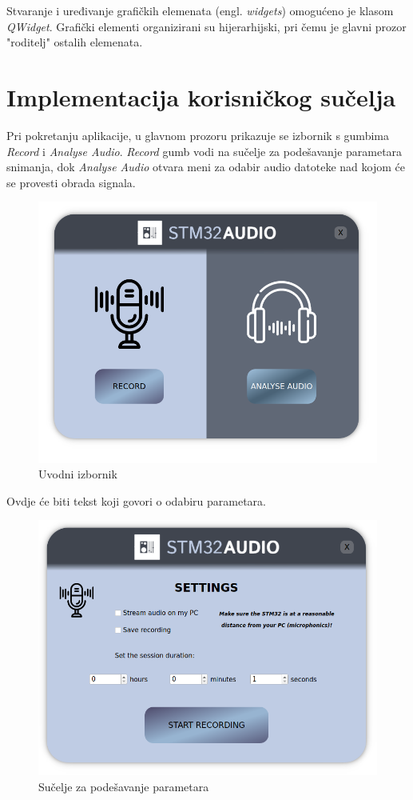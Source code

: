 Stvaranje i uređivanje grafičkih elemenata (engl. \textit{widgets}) omogućeno je klasom \textit{QWidget}. Grafički elementi organizirani su hijerarhijski, pri čemu je glavni prozor "roditelj" ostalih elemenata. 

\section{Implementacija korisničkog sučelja}

Pri pokretanju aplikacije, u glavnom prozoru prikazuje se izbornik s gumbima \textit{Record} i \textit{Analyse Audio}. \textit{Record} gumb vodi na sučelje za podešavanje parametara snimanja, dok \textit{Analyse Audio} otvara meni za odabir audio datoteke nad kojom će se provesti obrada signala.

\begin{figure}[ht]
	\includegraphics[width=\linewidth]{imgs/intro_form}
	\caption{Uvodni izbornik}
	\label{fig:intro_form}
\end{figure}


Ovdje će biti tekst koji govori o odabiru parametara.

\begin{figure}[ht]
	\includegraphics[width=\linewidth]{imgs/params_form}
	\caption{Sučelje za podešavanje parametara}
	\label{fig:params_form}
\end{figure}

